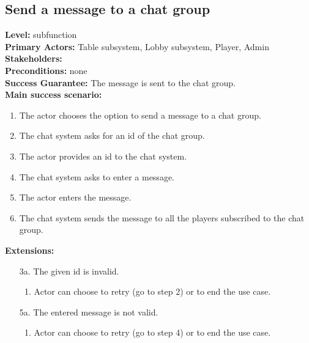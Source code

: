 \documentclass[a4paper,11pt]{report}
\begin{document}
\subsection{Send a message to a chat group}
\textbf{Level:} subfunction \\
\textbf{Primary Actors:} Table subsystem, Lobby subsystem, Player, Admin \\
\textbf{Stakeholders:}  \\
\textbf{Preconditions:} none \\
\textbf{Success Guarantee:} The message is sent to the chat group.  \\
\textbf{Main success scenario:} 
\begin{enumerate}
\item The actor chooses the option to send a message to a chat group. 
\item The chat system asks for an id of the chat group. 
\item The actor provides an id to the chat system.
\item The chat system asks to enter a message. 
\item The actor enters the message.
\item The chat system sends the message to all the players subscribed to the chat group.
\end{enumerate}
\textbf{Extensions:}
\begin{itemize}
\item[3a.] The given id is invalid.
\begin{enumerate}
\item Actor can choose to retry (go to step 2) or to end the use case. 
\end{enumerate}
\item[5a.] The entered message is not valid. 
\begin{enumerate}
\item Actor can choose to retry (go to step 4) or to end the use case. 
\end{enumerate}
\end{itemize}
\end{document}
